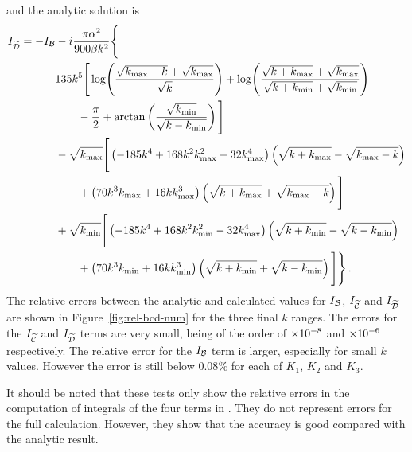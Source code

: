 % 
and the analytic solution is
% 
\begin{align}
\label{eq:dint-soln-num}
I_{\wt{\D}} = -I_\B &-i\frac{\pi\alpha^2}{900\beta k^2}\Bigg\{ \nonumber \\
	&135 k^5 \Bigg[ \log\Biggl(\frac{\sqrt{\kmax-k} + \sqrt{\kmax}}{\sqrt{k}}
			    \Biggr)
	 + \log\Biggl( \frac{\sqrt{k+\kmax} +\sqrt{\kmax}}{\sqrt{k+\kmin} +
			  \sqrt{\kmin}}\Biggr) \nonumber \\
	&\qquad -\frac{\pi}{2} + \arctan\left(
\frac{\sqrt{\kmin}}{\sqrt{k-\kmin}}\right)
	\Bigg] \nonumber\\
% 
        &-\sqrt{\kmax}\Bigg[ \left(-185k^4 + 168k^2\kmax^2-32\kmax^4
	    \right)\left(\sqrt{k+\kmax} - \sqrt{\kmax-k}\right) \nonumber \\
	&\qquad +\left(70k^3\kmax +16k\kmax^3\right) \left(\sqrt{k+\kmax} +
         \sqrt{\kmax -k} \right) \Bigg] \nonumber \\
% 
	&+\sqrt{\kmin}\Bigg[ \left(-185k^4 + 168k^2\kmin^2 -32\kmax^4
	    \right)\left(\sqrt{k+\kmin} - \sqrt{k-\kmin}\right) \nonumber \\
	&\qquad +\left(70k^3\kmin +16k\kmin^3\right) \left(\sqrt{k+\kmin} +
         \sqrt{k-\kmin} \right) \Bigg] \Bigg\} \,.
\end{align}
% 
The relative errors between the analytic and calculated values for $I_{\mathcal{B}}$,
$I_{\widetilde{\mathcal{C}}}$ and $I_{\widetilde{\mathcal{D}}}$ are shown in Figure~\ref{fig:rel-bcd-num} for the
three final $k$ ranges. The errors
for the $I_{\widetilde{\mathcal{C}}}$ and $I_{\widetilde{\mathcal{D}}}$ terms are very small, being of the order of
$\times 10^{-8}$ and $\times 10^{-6}$ respectively. The relative error for the $I_{\mathcal{B}}$ term is
larger, especially for small $k$ values. However the error is still below $0.08\%$
for each of $K_1$, $K_2$ and $K_3$.


It should be noted that these tests only show the relative errors in the
computation of integrals of the four terms in . They
do not represent
errors for the full calculation. However, they show that the accuracy is good
compared with the analytic result. 

